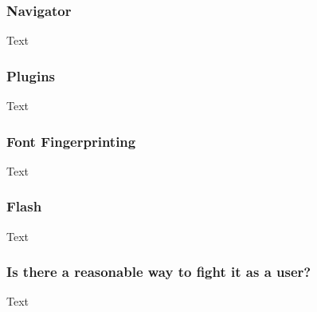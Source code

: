 \subsubsection{Navigator}

Text

\subsubsection{Plugins}

Text

\subsubsection{Font Fingerprinting}

Text

\subsubsection{Flash}

Text

\subsubsection{Is there a reasonable way to fight it as a user?}

Text

